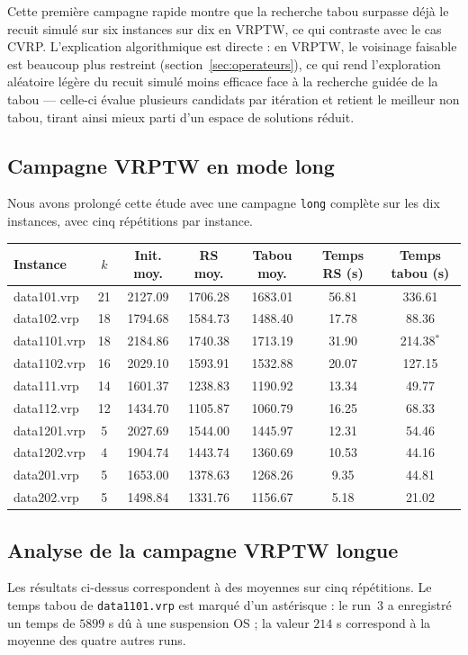 \documentclass[11pt,a4paper]{article}
\begin{document}
Cette première campagne rapide montre que la recherche tabou surpasse déjà le recuit simulé sur six instances sur dix en VRPTW, ce qui contraste avec le cas CVRP. L'explication algorithmique est directe : en VRPTW, le voisinage faisable est beaucoup plus restreint (section~\ref{sec:operateurs}), ce qui rend l'exploration aléatoire légère du recuit simulé moins efficace face à la recherche guidée de la tabou — celle-ci évalue plusieurs candidats par itération et retient le meilleur non tabou, tirant ainsi mieux parti d'un espace de solutions réduit.

\subsection{Campagne VRPTW en mode long}
Nous avons prolongé cette étude avec une campagne \texttt{long} complète sur les dix instances, avec cinq répétitions par instance.

\begin{center}
\begin{tabular}{lcccccc}
\toprule
Instance & \(k\) & Init. moy. & RS moy. & Tabou moy. & Temps RS (s) & Temps tabou (s) \\
\midrule
data101.vrp  & 21 & 2127.09 & 1706.28 & 1683.01 & 56.81 & 336.61 \\
data102.vrp  & 18 & 1794.68 & 1584.73 & 1488.40 & 17.78 & 88.36  \\
data1101.vrp & 18 & 2184.86 & 1740.38 & 1713.19 & 31.90 & 214.38$^*$ \\
data1102.vrp & 16 & 2029.10 & 1593.91 & 1532.88 & 20.07 & 127.15 \\
data111.vrp  & 14 & 1601.37 & 1238.83 & 1190.92 & 13.34 & 49.77  \\
data112.vrp  & 12 & 1434.70 & 1105.87 & 1060.79 & 16.25 & 68.33  \\
data1201.vrp & 5  & 2027.69 & 1544.00 & 1445.97 & 12.31 & 54.46  \\
data1202.vrp & 4  & 1904.74 & 1443.74 & 1360.69 & 10.53 & 44.16  \\
data201.vrp  & 5  & 1653.00 & 1378.63 & 1268.26 &  9.35 & 44.81  \\
data202.vrp  & 5  & 1498.84 & 1331.76 & 1156.67 &  5.18 & 21.02  \\
\bottomrule
\end{tabular}
\end{center}

\subsection{Analyse de la campagne VRPTW longue}
Les résultats ci-dessus correspondent à des moyennes sur cinq répétitions. Le temps tabou de \texttt{data1101.vrp} est marqué d'un astérisque : le run~3 a enregistré un temps de \(5899\) s dû à une suspension OS ; la valeur \(214\) s correspond à la moyenne des quatre autres runs.
\end{document}

